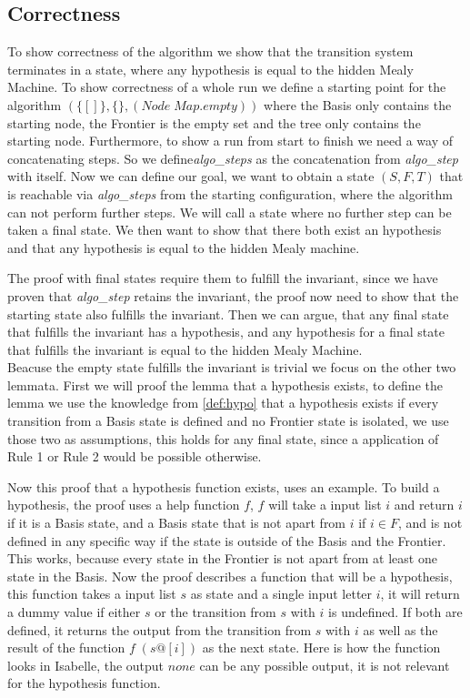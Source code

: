 \subsection{Correctness}
To show correctness of the algorithm we show that the transition system terminates in a state, where any hypothesis is equal to the hidden Mealy Machine. To show correctness of a whole run we define a starting point for the algorithm $(\{[]\},\{\},(Node \; Map.empty))$ where the Basis only contains the starting node, the Frontier is the empty set and the tree only contains the starting node. Furthermore, to show a run from start to finish we need a way of concatenating steps. So we define\textit{algo\_steps} as the concatenation from \textit{algo\_step} with itself. Now we can define our goal, we want to obtain a state $(S,F,T)$ that is reachable via \textit{algo\_steps} from the starting configuration, where the algorithm can not perform further steps. We will call a state where no further step can be taken a final state. We then want to show that there both exist an hypothesis and that any hypothesis is equal to the hidden Mealy machine.
\begin{myisabelle}
	\corollary
\end{myisabelle}
The proof with final states require them to fulfill the invariant, since we have proven that \textit{algo\_step} retains the invariant, the proof now need to show that the starting state also fulfills the invariant. Then we can argue, that any final state that fulfills the invariant has a hypothesis, and any hypothesis for a final state that fulfills the invariant is equal to the hidden Mealy Machine. \\
Beacuse the empty state fulfills the invariant is trivial we focus on the other two lemmata. First we will proof the lemma that a hypothesis exists, to define the lemma we use the knowledge from \autoref{def:hypo} that a hypothesis exists if every transition from a Basis state is defined and no Frontier state is isolated, we use those two as assumptions, this holds for any final state, since a application of Rule 1 or Rule 2 would be possible otherwise.
\begin{myisabelle}
	\existshypothesis
\end{myisabelle}
 Now this proof that a hypothesis function exists, uses an example. To build a hypothesis, the proof uses a help function $f$, $f$ will take a input list $i$ and return $i$ if it is a Basis state, and a Basis state that is not apart from $i$ if $i\in F$, and is not defined in any specific way if the state is outside of the Basis and the Frontier. This works, because every state in the Frontier is not apart from at least one state in the Basis. Now the proof describes a function that will be a hypothesis, this function takes a input list $s$ as state and a single input letter $i$, it will return a dummy value if either $s$ or the transition from $s$ with $i$ is undefined. If both are defined, it returns the output from the transition from $s$ with $i$ as well as the result of the function $f\; (s@[i])$ as the next state. Here is how the function looks in Isabelle, the output $none$ can be any possible output, it is not relevant for the hypothesis function.
